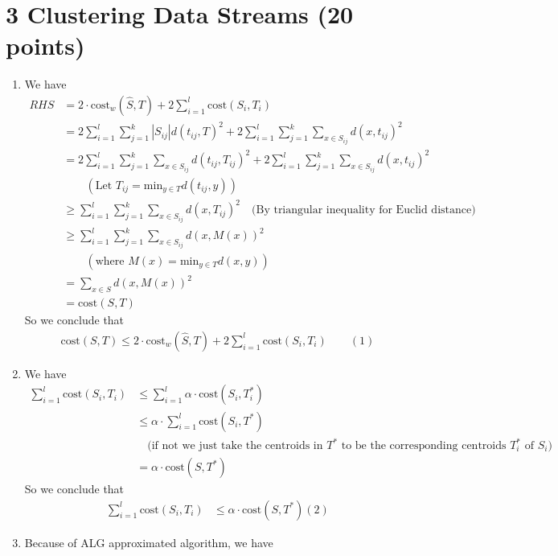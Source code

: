 \documentclass[12pt]{article}
\begin{document}
\section*{3 Clustering Data Streams (20 points)}
\begin{enumerate}[label=(\alph*)]
	\item
	We have
	\begin{align*}
		RHS &= 2 \cdot \text{cost}_w(\hat{S}, T) + 2\sum_{i=1}^l\text{cost}(S_i, T_i)\\\
		&= 2\sum_{i=1}^l\sum_{j=1}^k |S_{ij}|d(t_{ij}, T)^2 + 2\sum_{i=1}^l\sum_{j=1}^k\sum_{x\in S_{ij}}d(x, t_{ij})^2 \\
		&= 2\sum_{i=1}^l\sum_{j=1}^k\sum_{x \in S_{ij}}d(t_{ij}, T_{ij})^2 + 2\sum_{i=1}^l\sum_{j=1}^k\sum_{x\in S_{ij}}d(x, t_{ij})^2 \\
		&\qquad (\text{Let $T_{ij} = \text{min}_{y \in T}d(t_{ij}, y)$}) \\
		&\geq\sum_{i=1}^l\sum_{j=1}^k\sum_{x \in S_{ij}}d(x, T_{ij})^2 \quad \text{(By triangular inequality for Euclid distance)}\\
		&\geq\sum_{i=1}^l\sum_{j=1}^k\sum_{x \in S_{ij}}d(x, M(x))^2 \\
		&\qquad (\text{where $M(x)=\text{min}_{y \in T}d(x, y)$}) \\
		&= \sum_{x \in S}d(x, M(x))^2 \\
		&= \text{cost}(S, T)
	\end{align*}
	So we conclude that
	\begin{align*}
		\text{cost}(S, T) \leq 2 \cdot \text{cost}_w(\hat{S}, T) + 2\sum_{i=1}^l\text{cost}(S_i, T_i) \qquad (1)
	\end{align*}
	\item
	We have
	\begin{align*}
		\sum_{i=1}^l\text{cost}(S_i, T_i) &\leq \sum_{i=1}^l\alpha \cdot \text{cost}(S_i, T_i^*) \\
		&\leq \alpha \cdot \sum_{i=1}^l\text{cost}(S_i, T^*) \\
		&\quad\text{(if not we just take the centroids in $T^*$ to be the corresponding centroids $T_i^*$ of $S_i$)} \\
		&= \alpha\cdot\text{cost}(S, T^*)
	\end{align*}
	So we conclude that
	\begin{align*}
		\sum_{i=1}^l\text{cost}(S_i, T_i) &\leq \alpha\cdot\text{cost}(S, T^*) (2)
	\end{align*}
	\item
	Because of ALG approximated algorithm, we have

\end{enumerate}
\end{document}
